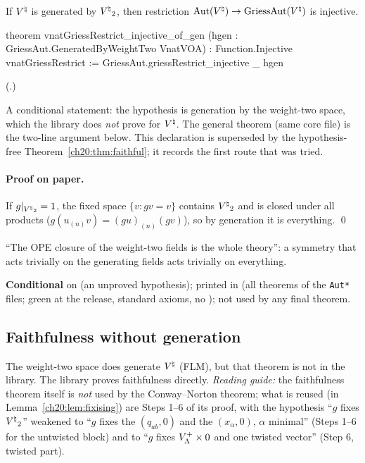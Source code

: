 \begin{theorem}\label{ch20:thm:faithgen}
If ${V^{\natural}}$ is generated by ${V^{\natural}}_2$, then restriction $\operatorname{Aut}({V^{\natural}})\to\mathrm{GriessAut}({V^{\natural}})$ is injective.
\end{theorem}
\begin{leancode}
theorem vnatGriessRestrict_injective_of_gen (hgen : GriessAut.GeneratedByWeightTwo VnatVOA) :
    Function.Injective vnatGriessRestrict :=
  GriessAut.griessRestrict_injective _ hgen
\end{leancode}
(.)
\begin{dictionary}
A conditional statement: the hypothesis  is generation by the weight-two space, which the library does
\emph{not} prove for ${V^{\natural}}$.  The general theorem  (same core file) is the
two-line argument below.  This declaration is superseded by the hypothesis-free
Theorem~\ref{ch20:thm:faithful}; it records the first route that was tried.
\end{dictionary}
\paragraph{Proof on paper.}  If $g|_{{V^{\natural}}_2}=1$, the fixed space $\{v:gv=v\}$ contains ${V^{\natural}}_2$ and is closed under
all products ($g(u_{(n)}v)=(gu)_{(n)}(gv)$), so by generation it is everything. \qed
\begin{physics}
``The OPE closure of the weight-two fields is the whole theory'': a symmetry that acts trivially on the generating
fields acts trivially on everything.
\end{physics}
\begin{status}
\textbf{Conditional} on  (an unproved hypothesis); printed in  (all theorems of the \texttt{Aut*} files; green at the release, standard axioms, no ); not used by any final theorem.
\end{status}

\subsection{Faithfulness without generation}

The weight-two space does generate ${V^{\natural}}$ (FLM), but that theorem is not in the library.  The library proves
faithfulness directly.  \emph{Reading guide:} the faithfulness theorem itself is \emph{not} used by the Conway--Norton theorem;
what is reused (in Lemma~\ref{ch20:lem:fixising}) are Steps 1--6 of its proof, with the hypothesis ``$g$ fixes ${V^{\natural}}_2$''
weakened to ``$g$ fixes the $(q_{ab},0)$ and the $(x_\alpha,0)$, $\alpha$ minimal'' (Steps 1--6 for the untwisted block) and to
``$g$ fixes $V_{\Lambda}^{+}\times0$ and one twisted vector'' (Step 6, twisted part).

